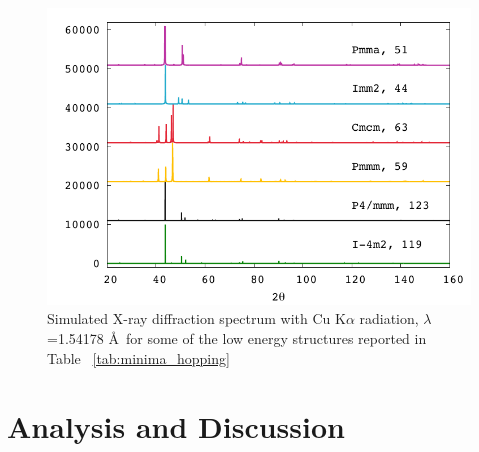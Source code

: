 \documentclass[%
preprint,
 amsmath,amssymb,
 aps,
prb,
showkeys,
]{revtex4-1}
\begin{document}
\begin{figure}[htp!]
  \includegraphics[scale=0.9]{figure_3}
  \caption{Simulated X-ray diffraction spectrum with Cu K$\alpha$ radiation, $\lambda$=1.54178 \AA \  for some of the low energy structures reported in Table~ \ref{tab:minima_hopping}} 
  \label{fig:xrd}
\end{figure}
\section{Analysis and Discussion}
\label{Sec:analysis}
\end{document}
